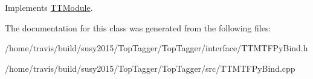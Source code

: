 Implements \hyperlink{classTTModule_a14e7c03fbf4ee1a5008c9344adc7c896}{T\-T\-Module}.



The documentation for this class was generated from the following files\-:\begin{DoxyCompactItemize}
\item 
/home/travis/build/susy2015/\-Top\-Tagger/\-Top\-Tagger/interface/T\-T\-M\-T\-F\-Py\-Bind.\-h\item 
/home/travis/build/susy2015/\-Top\-Tagger/\-Top\-Tagger/src/T\-T\-M\-T\-F\-Py\-Bind.\-cpp\end{DoxyCompactItemize}
